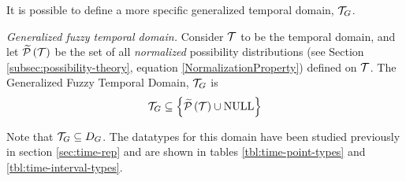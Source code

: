 


It is possible to define a more specific generalized temporal domain, $\mathcal{T}_G$.

\begin{definition}
\label{def:generalized-fuzzy-temporal-domain}
\emph{Generalized fuzzy temporal domain.}
Consider $\mathcal{T}$ to be the temporal domain, and let $\widetilde {\mathcal{P}}\left( \mathcal{T}\right)$ be the set of all \emph{normalized} possibility distributions (see Section \ref{subsec:possibility-theory}, equation \eqref{NormalizationProperty}) defined on $\mathcal{T}$.
The Generalized Fuzzy Temporal Domain, $\mathcal{T}_G$ is
\begin{equation}
\mathcal{T}_G \subseteq \left \lbrace \widetilde {\mathcal{P}}\left( \mathcal{T}\right) \cup \text{NULL} \right \rbrace
\end{equation}
\end{definition}

Note that $\mathcal{T}_G \subseteq D_G$. The datatypes for this domain have been studied previously in section \ref{sec:time-rep} and are shown in tables \ref{tbl:time-point-types} and \ref{tbl:time-interval-types}.

